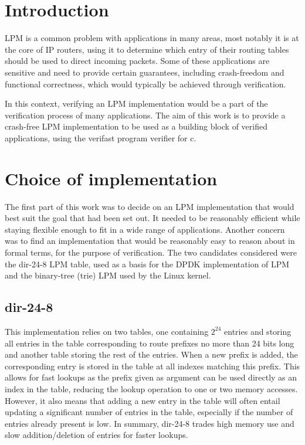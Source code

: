\documentclass{article}
\begin{document}
\section{Introduction}
LPM is a common problem with applications in many areas, most notably it is at the
core of IP routers, using it to determine which entry of their routing tables should
be used to direct incoming packets. Some of these applications are sensitive and
need to provide certain guarantees, including crash-freedom and functional correctness,
which would typically be achieved through verification. \par
In this context, verifying an LPM implementation
would be a part of the verification process of many applications. The aim of this
work is to provide a crash-free LPM implementation to be used as a building block of
verified applications, using the verifast program verifier for c.
\section{Choice of implementation}
The first part of this work was to decide on an LPM implementation that would best
suit the goal that had been set out. It needed to be reasonably efficient while staying
flexible enough to fit in a wide range of applications. Another concern was to find
an implementation that would be reasonably easy to reason about in formal terms, for
the purpose of verification. The two candidates considered were the dir-24-8 LPM
table, used as a basis for the DPDK implementation of LPM and the binary-tree (trie)
LPM used by the Linux kernel.
\subsection{dir-24-8}
This implementation relies on two tables, one containing $2^{24}$ entries and storing
all entries in the table corresponding to route prefixes no more than 24 bits long
and another table storing the rest of the entries. When a new prefix is added, the
corresponding entry is stored in the table at all indexes matching this prefix. This
allows for fast lookups as the prefix given as argument can be used directly as an
index in the table, reducing the lookup operation to one or two memory accesses.
However, it also means that adding a new entry in the table will often entail updating
a significant number of entries in the table, especially if the number of entries
already present is low. In summary, dir-24-8 trades high memory use and slow
addition/deletion of entries for faster lookups.
\end{document}
